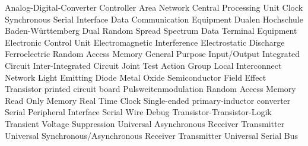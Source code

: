 

\begin{acronym} [MOSFET]               %

	 		{Analog-Digital-Converter}
	 		{Controller Area Network}
	 		{Central Processing Unit}
	 	{Clock Synchronous Serial Interface}
	 		{Data Communication Equipment}
	 	{Dualen Hochschule Baden-Württemberg}
	 	{Dual Random Spread Spectrum}
	 		{Data Terminal Equipment}
	 		{Electronic Control Unit}
	 		{Electromagnetic Interference}
	 		{Electrostatic Discharge}
	 	{Ferroelectric Random Access Memory}
	 	{General Purpose Input/Output}
	 		{Integrated Circuit}
	 		{Inter-Integrated Circuit}
	 	{Joint Test Action Group}
	 		{Local Interconnect Network}
			{Light Emitting Diode}
	 	{Metal Oxide Semiconductor Field Effect Transistor}
	 		{printed circuit board}
	 		{Pulsweitenmodulation}
	 		{Random Access Memory}
	 		{Read Only Memory}
	 		{Real Time Clock}
	 	{Single-ended primary-inductor converter}
	 		{Serial Peripheral Interface}
	 		{Serial Wire Debug}
	 		{Transistor-Transistor-Logik}
	 		{Transient Voltage Suppression}
	 	{Universal Asynchronous Receiver Transmitter}
	 	{Universal Synchronous/Asynchronous Receiver Transmitter}
	 		{Universal Serial Bus}
\end{acronym}
